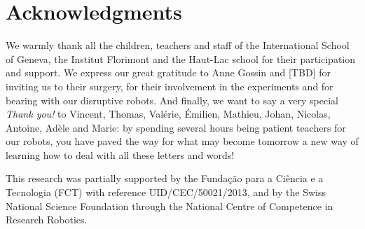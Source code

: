 \documentclass{article}
\begin{document}
\section*{Acknowledgments}

We warmly thank all the children, teachers and staff of the International School
of Geneva, the Institut Florimont and the Haut-Lac school for their
participation and support. We express our great gratitude to Anne Gossin and [TBD] for
inviting us to their surgery, for their involvement in the experiments and for
bearing with our disruptive robots. And finally, we want to say a very special \emph{Thank
you!} to Vincent, Thomas, Valérie, Émilien, Mathieu, Johan, Nicolas, Antoine,
Adèle and Marie: by spending several hours being patient teachers for our
robots, you have paved the way for what may become tomorrow a new way of
learning how to deal with all these letters and words!

This research was partially supported by the Funda\c{c}\~{a}o para a Ci\^{e}ncia
e a Tecnologia (FCT) with reference UID/CEC/50021/2013, and by the Swiss
National Science Foundation through the National Centre of Competence in
Research Robotics.



\end{document}
